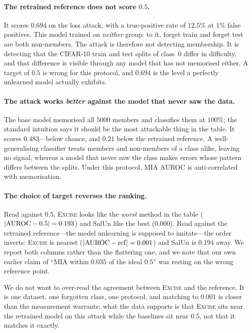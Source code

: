 \documentclass{article}
\newcommand{\ours}{\textsc{Excise}}
\theoremstyle{remark}
\theoremstyle{plain}
\begin{document}
\paragraph{The retrained reference does not score $0.5$.}
It scores $0.694$ on the loss attack, with a true-positive rate of $12.5\%$ at
$1\%$ false positives. This model trained on \emph{neither} group: to it, forget
train and forget test are both non-members. The attack is therefore not
detecting membership. It is detecting that the CIFAR-10 train and test splits of
class~0 differ in difficulty, and that difference is visible through any model
that has not memorised either. A target of $0.5$ is wrong for this protocol, and
$0.694$ is the level a perfectly unlearned model actually exhibits.

\paragraph{The attack works \emph{better} against the model that never saw the
data.} The base model memorised all $5000$ members and classifies them at
$100\%$; the standard intuition says it should be the most attackable thing in
the table. It scores $0.483$---below chance, and $0.21$ below the retrained
reference. A well-generalising classifier treats members and non-members of a
class alike, leaving no signal, whereas a model that never saw the class makes
errors whose pattern differs between the splits. Under this protocol, MIA AUROC
is anti-correlated with memorisation.

\paragraph{The choice of target reverses the ranking.}
Read against $0.5$, \ours{} looks like the \emph{worst} method in the table
($|{\rm AUROC}-0.5| = 0.193$) and SalUn like the best ($0.000$). Read against the
retrained reference---the model unlearning is supposed to imitate---the order
inverts: \ours{} is nearest ($|{\rm AUROC}-{\rm ref}| = 0.001$) and SalUn is
$0.194$ away. We report both columns rather than the flattering one, and we note
that our own earlier claim of ``MIA within $0.035$ of the ideal $0.5$'' was
resting on the wrong reference point.

We do not want to over-read the agreement between \ours{} and the reference. It
is one dataset, one forgotten class, one protocol, and matching to $0.001$ is
closer than the measurement warrants; what the data supports is that \ours{}
sits near the retrained model on this attack while the baselines sit near $0.5$,
not that it matches it exactly.
\end{document}
